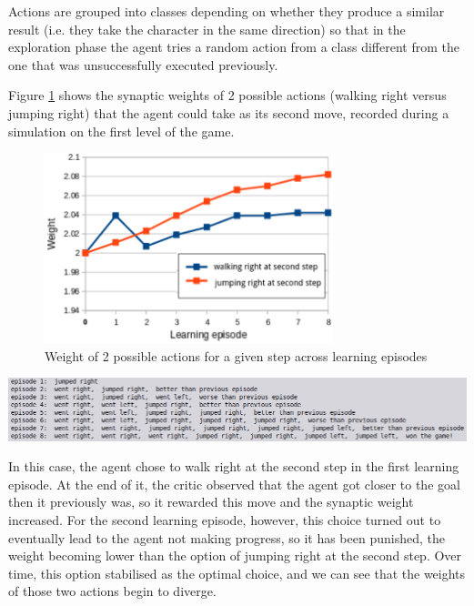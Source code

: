 \documentclass[10pt]{article}
\begin{document}
    Actions are grouped into classes depending on whether they produce a similar result (i.e. they take the character in the same direction) so that in the exploration phase the agent tries a random action from a class different from the one that was unsuccessfully executed previously.

    Figure \ref{fig:learning} shows the synaptic weights of 2 possible actions (walking right versus jumping right) that the agent could take as its second move, recorded during a simulation on the first level of the game. 
    
    \begin{figure}[ht!]
    \centering
    \includegraphics[width=84mm]{./learning.png}
    \caption{Weight of 2 possible actions for a given step across learning episodes}
    \label{fig:learning}
    \end{figure}
    \setcounter{figure}{9}

    \setcounter{suppfigure}{8}
    \begin{suppfigure*}
    \center
    \includegraphics[width=180mm]{./history.png}
    \caption{Logs showing the activity of the agent and the evaluation of the critic over learning episodes}
    \label{fig:history}
    \end{suppfigure*}
    
    In this case, the agent chose to walk right at the second step in the first learning episode. At the end of it, the critic observed that the agent got closer to the goal then it previously was, so it rewarded this move and the synaptic weight increased. For the second learning episode, however, this choice turned out to eventually lead to the agent not making progress, so it has been punished, the weight becoming lower than the option of jumping right at the second step. Over time, this option stabilised as the optimal choice, and we can see that the weights of those two actions begin to diverge.
\end{document}
